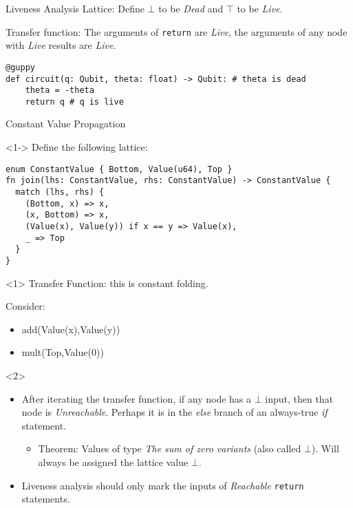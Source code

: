 \documentclass[presentation]{beamer}
\begin{document}
\begin{frame}[label={sec:org1ba4bb6},fragile]{Liveness Analysis}
 Lattice: Define \(\bot\) to be \emph{Dead} and \(\top\) to be \emph{Live}.

Transfer function: The arguments of \texttt{return} are \emph{Live}, the arguments of any node with \emph{Live} results are \emph{Live}.

\begin{verbatim}
@guppy
def circuit(q: Qubit, theta: float) -> Qubit: # theta is dead
    theta = -theta
    return q # q is live
\end{verbatim}
\end{frame}
\begin{frame}[label={sec:orgaeaade6},fragile]{Constant Value Propagation}
 \begin{onlyenv}<1->
Define the following lattice:

\begin{verbatim}
enum ConstantValue { Bottom, Value(u64), Top }
fn join(lhs: ConstantValue, rhs: ConstantValue) -> ConstantValue {
  match (lhs, rhs) {
    (Bottom, x) => x,
    (x, Bottom) => x,
    (Value(x), Value(y)) if x == y => Value(x),
    _ => Top
  }
}
\end{verbatim}
\end{onlyenv}
\begin{onlyenv}<1>
Transfer Function: this is constant folding.

Consider:
\begin{itemize}
\item add(Value(x),Value(y))
\item mult(Top,Value(0))
\end{itemize}
\end{onlyenv}
\begin{onlyenv}<2>
\begin{itemize}
\item After iterating the transfer function, if any node has a \(\bot\) input, then that node is \emph{Unreachable}. Perhaps it is in the \emph{else} branch of an always-true \emph{if} statement.

\begin{itemize}
\item Theorem: Values of type \emph{The sum of zero variants} (also called \(\bot\)). Will always be assigned the lattice value \(\bot\).
\end{itemize}

\item Liveness analysis should only mark the inputs of \emph{Reachable} \texttt{return} statements.
\end{itemize}
\end{onlyenv}
\end{frame}
\end{document}
